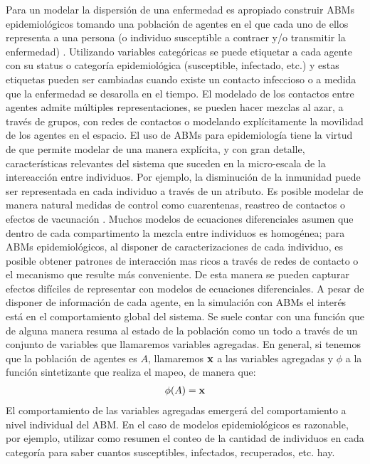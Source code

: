 Para un modelar la dispersión de una enfermedad es apropiado construir ABMs epidemiológicos tomando una población de agentes en el que cada uno de ellos representa a una persona (o individuo susceptible a contraer y/o transmitir la enfermedad) \citep{Roche2011}. Utilizando variables categóricas se puede etiquetar a cada agente con su status o categoría epidemiológica (susceptible, infectado, etc.) y estas etiquetas pueden ser cambiadas cuando existe un contacto infeccioso o a medida que la enfermedad se desarolla en el tiempo. El modelado de los contactos entre agentes admite múltiples representaciones, se pueden hacer mezclas al azar, a través de grupos, con redes de contactos o modelando explícitamente la movilidad de los agentes en el espacio. El uso de ABMs para epidemiología tiene la virtud de que permite modelar de una manera explícita, y con gran detalle, características relevantes del sistema que suceden en la micro-escala de la intereacción entre individuos. Por ejemplo, la disminución de la inmunidad puede ser representada en cada individuo a través de un atributo. Es posible modelar de manera natural medidas de control como cuarentenas, reastreo de contactos o efectos de vacunación \cite{Silva2020}. Muchos modelos de ecuaciones diferenciales asumen que dentro de cada compartimento la mezcla entre individuos es homogénea; para ABMs epidemiológicos, al disponer de caracterizaciones de cada individuo, es posible obtener patrones de interacción mas ricos a través de redes de contacto o el mecanismo que resulte más conveniente. De esta manera se pueden capturar efectos difíciles de representar con modelos de ecuaciones diferenciales. A pesar de disponer de información de cada agente, en la simulación con ABMs el interés está en el comportamiento global del sistema. Se suele contar con una función que de alguna manera resuma al estado de la población como un todo a través de un conjunto de variables que llamaremos variables agregadas. En general, si tenemos que la población de agentes es $A$, llamaremos $\mathbf{x}$ a las variables agregadas y $\phi$ a la función sintetizante que realiza el mapeo, de manera que:
\begin{align}
    \phi (A) = \mathbf{x}
\end{align}
El comportamiento de las variables agregadas emergerá del comportamiento a nivel individual del ABM. En el caso de modelos epidemiológicos es razonable, por ejemplo, utilizar como resumen el conteo de la cantidad de individuos en cada categoría para saber cuantos susceptibles, infectados, recuperados, etc. hay.

